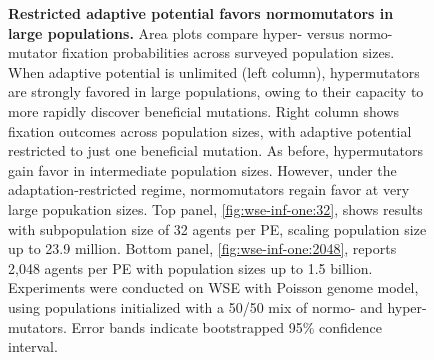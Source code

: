 \begin{figure}[h]
\begin{minipage}{0.7\textwidth}
  \end{minipage}%
  \begin{minipage}{0.3\textwidth}
    \caption{%
      \textbf{Restricted adaptive potential favors normomutators in large populations.}
      \footnotesize
      Area plots compare hyper- versus normo-mutator fixation probabilities across surveyed population sizes.
      When adaptive potential is unlimited (left column), hypermutators are strongly favored in large populations, owing to their capacity to more rapidly discover beneficial mutations.
      Right column shows fixation outcomes across population sizes, with adaptive potential restricted to just one beneficial mutation.
      As before, hypermutators gain favor in intermediate population sizes.
      However, under the adaptation-restricted regime, normomutators regain favor at very large popukation sizes.
      Top panel, \ref{fig:wse-inf-one:32}, shows results with subpopulation size of 32 agents per PE, scaling population size up to 23.9 million.
      Bottom panel, \ref{fig:wse-inf-one:2048}, reports 2,048 agents per PE with population sizes up to 1.5 billion.
      Experiments were conducted on WSE with Poisson genome model, using populations initialized with a 50/50 mix of normo- and hyper-mutators.
      Error bands indicate bootstrapped 95\% confidence interval.
    }
    \label{fig:wse-inf-one}
  \end{minipage}
\end{figure}
